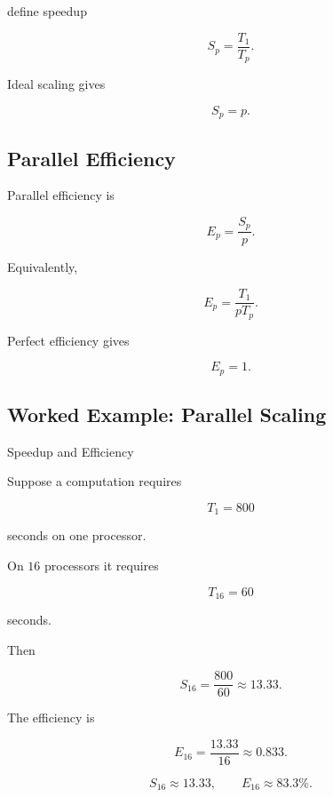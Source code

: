 define speedup

\[
\boxed{
S_p
=
\frac{
T_1
}{
T_p
}.
}
\]

Ideal scaling gives

\[
\boxed{
S_p=p.
}
\]

\subsection{Parallel Efficiency}
\label{subsec:hpmc-parallel-efficiency}

Parallel efficiency is

\[
\boxed{
E_p
=
\frac{
S_p
}{
p
}.
}
\]

Equivalently,

\[
\boxed{
E_p
=
\frac{
T_1
}{
pT_p
}.
}
\]

Perfect efficiency gives

\[
\boxed{
E_p=1.
}
\]

\subsection{Worked Example: Parallel Scaling}
\label{subsec:worked-hpmc-scaling}

\begin{workedexamplebox}{Speedup and Efficiency}

Suppose a computation requires

\[
T_1=800
\]

seconds on one processor.

On \(16\) processors it requires

\[
T_{16}=60
\]

seconds.

Then

\[
S_{16}
=
\frac{800}{60}
\approx
13.33.
\]

The efficiency is

\[
E_{16}
=
\frac{
13.33
}{
16
}
\approx
0.833.
\]

\begin{answerbox}
\[
\boxed{
S_{16}\approx13.33,
\qquad
E_{16}\approx83.3\%.
}
\]
\end{answerbox}

\end{workedexamplebox}

